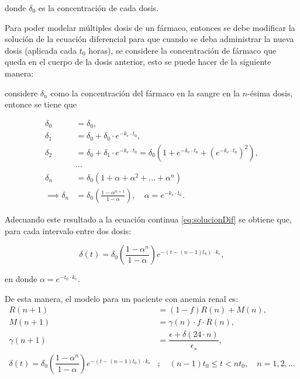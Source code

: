 donde $\delta_0$ es la concentración de cada dosis.

Para poder modelar múltiples dosis de un fármaco, entonces se debe modificar la solución de la ecuación diferencial para que cuando se deba administrar la nueva dosis (aplicada cada $t_0$ horas), se considere la concentración de fármaco que queda en el cuerpo de la dosis anterior, esto se puede hacer de la siguiente manera:

considere $\delta_n$ como la concentración del fármaco en la sangre en la $n$-ésima dosis, entonce se tiene que 

\begin{align*}
    \delta_0 &= \delta_0,\\
    \delta_1 &= \delta_0 + \delta_0\cdot e^{-k_e\cdot t_0}, \\
    \delta_2 &= \delta_0 + \delta_1\cdot e^{-k_e\cdot t_0}= \delta_0\left(1+e^{-k_e\cdot t_0}+\left(e^{-k_e\cdot t_0}\right)^2\right), \\
    &\cdots \\
    \delta_n &= \delta_0(1+\alpha+\alpha^2+...+\alpha^{n}) \\
    \implies \delta_n &= \delta_0\left(\frac{1-\alpha^{n+1}}{1-\alpha}\right),\quad \alpha=e^{-k_e\cdot t_0}.
\end{align*}

Adecuando este resultado a la ecuación continua \ref{eq:solucionDif} se obtiene que, para cada intervalo entre dos dosis:

\begin{equation*}
    \delta(t) = \delta_{0} \left(\dfrac{1-\alpha^{n}}{1 - \alpha}\right) e^{-(t- (n-1) t_{0})\cdot k_e},
\end{equation*}  

en donde $\alpha = e^{-t_0\cdot k_e}$.

De esta manera, el modelo para un paciente con anemia renal es:
\begin{align}\label{eq:ModeloAnemia}
    R(n+1) &=(1-f)R(n)+M(n), \\
    M(n+1) &=\gamma(n) \cdot f\cdot R(n), \nonumber \\
    \gamma(n+1) &=\dfrac{\epsilon + \delta(24\cdot n)}{\epsilon_s}, \nonumber \\
    \delta(t) = \delta_{0} \left(\dfrac{1-\alpha^{n}}{1 - \alpha}\right) e^{-(t- (n-1) t_{0})\cdot k_e} &; \quad (n-1)t_{0} \leq t < n t_{0}, \quad n=1,2,\dots\nonumber
\end{align}

